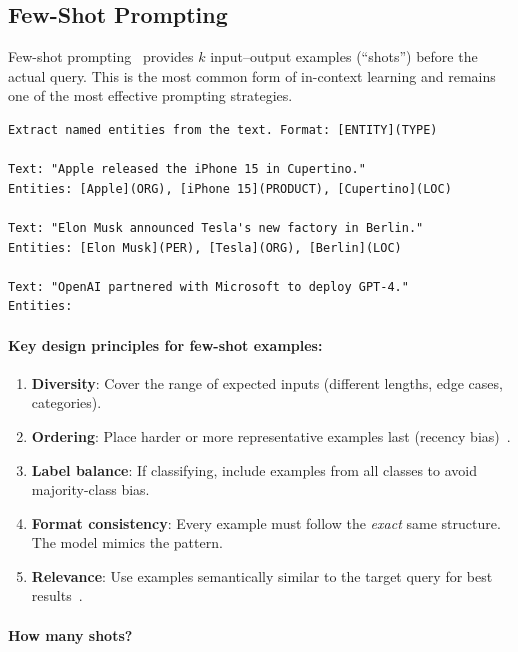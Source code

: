 \subsection{Few-Shot Prompting}
\label{few-shot-prompting}

Few-shot prompting~\cite{brown2020language} provides $k$ input--output examples (``shots'') before the actual query. This is the most common form of in-context learning and remains one of the most effective prompting strategies.

\begin{examplebox}
\begin{lstlisting}
Extract named entities from the text. Format: [ENTITY](TYPE)

Text: "Apple released the iPhone 15 in Cupertino."
Entities: [Apple](ORG), [iPhone 15](PRODUCT), [Cupertino](LOC)

Text: "Elon Musk announced Tesla's new factory in Berlin."
Entities: [Elon Musk](PER), [Tesla](ORG), [Berlin](LOC)

Text: "OpenAI partnered with Microsoft to deploy GPT-4."
Entities:
\end{lstlisting}
\end{examplebox}

\paragraph{Key design principles for few-shot examples:}
\label{key-design-principles-for-few-shot-examples}

\begin{enumerate}
  \item \textbf{Diversity}: Cover the range of expected inputs (different lengths, edge cases, categories).
  \item \textbf{Ordering}: Place harder or more representative examples last (recency bias)~\cite{lu2022fantastically}.
  \item \textbf{Label balance}: If classifying, include examples from all classes to avoid majority-class bias.
  \item \textbf{Format consistency}: Every example must follow the \emph{exact} same structure. The model mimics the pattern.
  \item \textbf{Relevance}: Use examples semantically similar to the target query for best results~\cite{liu2022makes}.
\end{enumerate}

\paragraph{How many shots?}
\label{how-many-shots}

